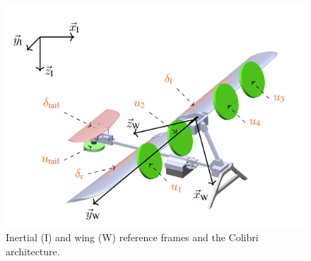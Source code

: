 \begin{figure}[h]
\centering
    \includegraphics[width=1\columnwidth,angle=0,trim={0 0 0 0.5cm},clip]{figures/wold_body.png}
    \caption{Inertial (I) and wing (W) reference frames and the Colibri architecture. }
    \label{fig:world_body}
\end{figure}

